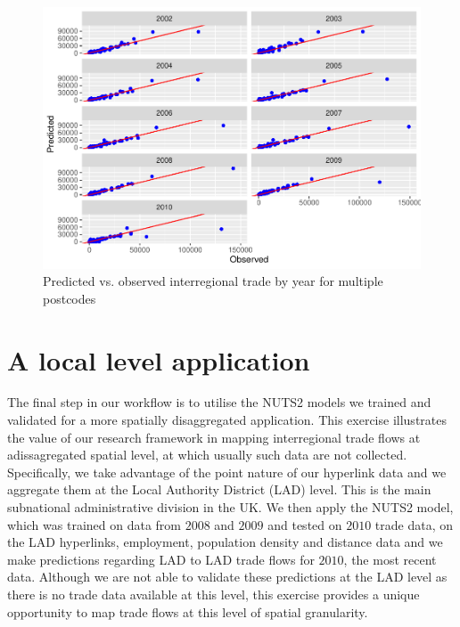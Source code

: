 \documentclass[]{interact}
\theoremstyle{plain}%
\theoremstyle{definition}
\theoremstyle{remark}
\begin{document}
\begin{figure}[p]
\includegraphics[width=1\linewidth]{hl_v2_files/figure-latex/unnamed-chunk-12-1} \caption{\label{prediction_multi_pc}Predicted vs. observed interregional trade by year for multiple postcodes}\label{fig:unnamed-chunk-12}
\end{figure}

\hypertarget{a-local-level-application}{%
\section{A local level application}\label{a-local-level-application}}

The final step in our workflow is to utilise the NUTS2 models we trained
and validated for a more spatially disaggregated application. This
exercise illustrates the value of our research framework in mapping
interregional trade flows at adissagregated spatial level, at which
usually such data are not collected. Specifically, we take advantage of
the point nature of our hyperlink data and we aggregate them at the
Local Authority District (LAD) level. This is the main subnational
administrative division in the UK. We then apply the NUTS2 model, which
was trained on data from \(2008\) and \(2009\) and tested on \(2010\)
trade data, on the LAD hyperlinks, employment, population density and
distance data and we make predictions regarding LAD to LAD trade flows
for \(2010\), the most recent data. Although we are not able to validate
these predictions at the LAD level as there is no trade data available
at this level, this exercise provides a unique opportunity to map trade
flows at this level of spatial granularity.
\end{document}
